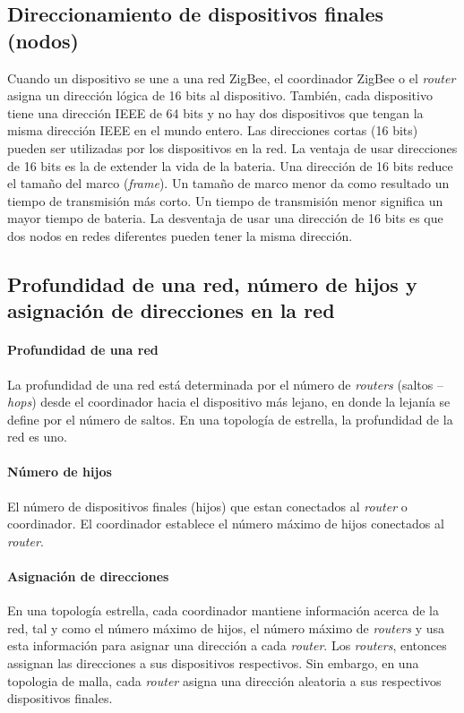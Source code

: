 \documentclass[10pt,journal,compsoc]{IEEEtran}
\begin{document}
\subsection{Direccionamiento de dispositivos finales (nodos)}
Cuando un dispositivo se une a una red ZigBee, el coordinador ZigBee o el \emph{router} asigna un dirección lógica de 16 bits al dispositivo. También, cada dispositivo tiene una dirección IEEE de 64 bits y no hay dos dispositivos que tengan la misma dirección IEEE en el mundo entero. Las direcciones cortas (16 bits) pueden ser utilizadas por los dispositivos en la red. La ventaja de usar direcciones de 16 bits es la de extender la vida de la bateria. Una dirección de 16 bits reduce el tamaño del marco (\emph{frame}). Un tamaño de marco menor da como resultado un tiempo de transmisión más corto. Un tiempo de transmisión menor significa un mayor tiempo de bateria. La desventaja de usar una dirección de 16 bits es que dos nodos en redes diferentes pueden tener la misma dirección.

\subsection{Profundidad de una red, número de hijos y asignación de direcciones en la red}

\paragraph*{\textbf{Profundidad de una red}} La profundidad de una red está determinada por el número de \emph{routers} (saltos -- \emph{hops}) desde el coordinador hacia el dispositivo más lejano, en donde la lejanía se define por el número de saltos. En una topología de estrella, la profundidad de la red es uno.

\paragraph*{\textbf{Número de hijos}} El número de dispositivos finales (hijos) que estan conectados al \emph{router} o coordinador. El coordinador establece el número máximo de hijos conectados al \emph{router}. 

\paragraph*{\textbf{Asignación de direcciones}} En una topología estrella, cada coordinador mantiene información acerca de la red, tal y como el número máximo de hijos, el número máximo de \emph{routers} y usa esta información para asignar una dirección a cada \emph{router}. Los \emph{routers}, entonces assignan las direcciones a sus dispositivos respectivos. Sin embargo, en una topologia de malla, cada \emph{router} asigna una dirección aleatoria a sus respectivos dispositivos finales.
\end{document}
